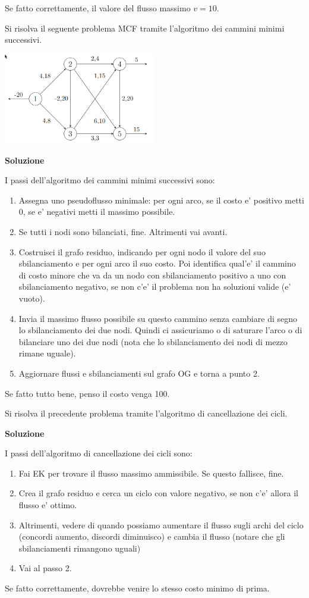 Se fatto correttamente, il valore del flusso massimo $ v = 10 $.
\begin{Exercise}{}{}   
Si risolva il seguente problema MCF tramite l’algoritmo dei cammini minimi successivi.
\begin{center}
  \includegraphics[width=0.5\textwidth]{img/2025-04-07-10-27-08.png}
\end{center}
\textbf{Soluzione}

I passi dell'algoritmo dei cammini minimi successivi sono:
\begin{enumerate}
\item Assegna uno pseudoflusso minimale: per ogni arco, se il costo e' positivo metti 0, se e' negativi metti il massimo possibile.
\item Se tutti i nodi sono bilanciati, fine. Altrimenti vai avanti.
\item Costruisci il grafo residuo, indicando per ogni nodo il valore del suo sbilanciamento e per ogni arco il suo costo. Poi identifica qual'e' il cammino di costo minore che va da un nodo con sbilanciamento positivo a uno con sbilanciamento negativo, se non c'e' il problema non ha soluzioni valide (e' vuoto).
\item Invia il massimo flusso possibile su questo cammino senza cambiare di segno lo sbilanciamento dei due nodi. Quindi ci assicuriamo o di saturare l'arco o di bilanciare uno dei due nodi (nota che lo sbilanciamento dei nodi di mezzo rimane uguale).
\item Aggiornare flussi e sbilanciamenti sul grafo OG e torna a punto 2.
\end{enumerate}
Se fatto tutto bene, penso il costo venga 100.
\end{Exercise}

\begin{Exercise}{}{}
Si risolva il precedente problema tramite l’algoritmo di cancellazione dei cicli.

\textbf{Soluzione}

I passi dell'algoritmo di cancellazione dei cicli sono:
\begin{enumerate}
\item Fai EK per trovare il flusso massimo ammissibile. Se questo fallisce, fine.
\item Crea il grafo residuo e cerca un ciclo con valore negativo, se non c'e' allora il flusso e' ottimo.
\item Altrimenti, vedere di quando possiamo aumentare il flusso sugli archi del ciclo (concordi aumento, discordi diminuisco) e cambia il flusso (notare che gli sbilanciamenti rimangono uguali)
\item Vai al passo 2.
\end{enumerate}
Se fatto correttamente, dovrebbe venire lo stesso costo minimo di prima.
\end{Exercise}
% 

